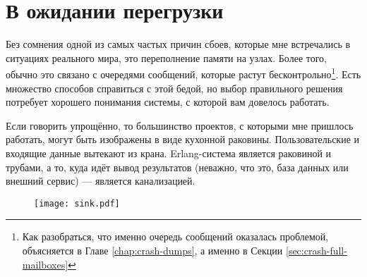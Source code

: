 \documentclass[11pt, oneside]{book}   	%
\begin{document}

\chapter{В ожидании перегрузки}
\label{chap:overload}

Без сомнения одной из самых частых причин сбоев, которые мне встречались в ситуациях реального мира, это переполнение памяти на узлах. Более того, обычно это связано с очередями сообщений, которые растут бесконтрольно\footnote{Как разобраться, что именно очередь сообщений оказалась проблемой, объясняется в Главе \ref{chap:crash-dumps}, а именно в Секции \ref{sec:crash-full-mailboxes}}. Есть множество способов справиться с этой бедой, но выбор правильного решения потребует хорошего понимания системы, с которой вам довелось работать.

Если говорить упрощённо, то большинство проектов, с которыми мне пришлось работать, могут быть изображены в виде кухонной раковины. Пользовательские и входящие данные вытекают из крана. Erlang-система является раковиной и трубами, а то, куда идёт вывод результатов (неважно, что это, база данных или внешний сервис) --- является канализацией.

\begin{figure}[h!]
  \texttt{[image: sink.pdf]}%
  \centering%
   \label{fig:tracing-venn}
\end{figure}
\end{document}
